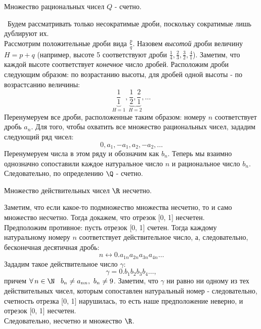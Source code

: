 
\begin{theorem}
    Множество рациональных чисел \(Q\) - счетно.

    \vspace{2mm}

    \proofname~Будем рассматривать только несократимые дроби,
    поскольку сократимые лишь дублируют их. \\
    Рассмотрим положительные дроби вида \(\frac{p}{q}\). Назовем \textit{высотой}
    дроби величину \(H = p+q\) (например, высоте 5 соответствуют дроби
    \(\frac{1}{4}, \frac{2}{3}, \frac{3}{2}, \frac{4}{1}\)). 
    Заметим, что каждой высоте соответствует \textit{конечное} число дробей.
    Расположим дроби следующим образом: по возрастанию высоты, 
    для дробей одной высоты - по возрастсанию величины:
    \[\underbrace{\frac{1}{1}}_{H=1}, \underbrace{\frac{1}{2}, \frac{2}{1}}_{H=2}, \dots\]
    Перенумеруем все дроби, расположенные таким образом:
    номеру \(n\) соответствует дробь \(a_{n}\).
    Для того, чтобы охватить все множество рациональных чисел, зададим 
    следующий ряд чисел:
    \[0, a_{1}, -a_{1}, a_{2}, -a_{2}, \dots \]
    Перенумеруем числа в этом ряду и обозначим как \(b_{n}\).
    Теперь мы взаимно однозначно сопоставили
    каждое натуральное число \(n\) и рациональное число \(b_{n}\).
    Следовательно, по определению \(\Q\) - счетно.~\qedsymbol
\end{theorem}

\begin{theorem}
    Множество действительных чисел \(\R\) несчетно.

    \vspace{2mm}

    Заметим, что если какое-то подмножество множества несчетно, то и само множество несчетно.
    Тогда докажем, что отрезок [0, 1] несчетен. \\
    Предположим противное: пусть отрезок [0, 1] счетен. Тогда каждому натуральному номеру \(n\)
    соответствует действительное число, а, следовательно, бесконечная десятичная дробь:
    \[n \longleftrightarrow 0.a_{1n}a_{2n}a_{3n}a_{4n}\dots\]
    Зададим такое действительное число \(\gamma\):
    \[\gamma = 0.b_{1}b_{2}b_{3}b_{4}\dots,\]
    причем \(\forall\,n\in\N\hspace{3mm} b_{n}\neq a_{nn},~ b_{n} \neq 9\).
    Заметим, что \(\gamma\) ни равно ни одному из тех действительных чисел, 
    которым сопоставлен натуральный номер - следовательно, счетность отрезка [0, 1]
    нарушилась, то есть наше предположение неверно, и отрезок [0, 1] несчетен.\\
    Следовательно, несчетно и множество \(\R\).
\end{theorem}
